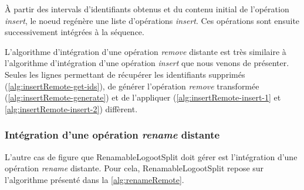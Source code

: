 \documentclass[12pt]{thesul}
\begin{document}
À partir des intervals d'identifiants obtenus et du contenu initial de l'opération \emph{insert}, le noeud regénère une liste d'opérations \emph{insert}.
Ces opérations sont ensuite successivement intégrées à la séquence.

L'algorithme d'intégration d'une opération \emph{remove} distante est très similaire à l'algorithme d'intégration d'une opération \emph{insert} que nous venons de présenter.
Seules les lignes permettant de récupérer les identifiants supprimés (\ref{alg:insertRemote-get-ids}), de générer l'opération \emph{remove} transformée (\ref{alg:insertRemote-generate}) et de l'appliquer (\ref{alg:insertRemote-insert-1} et \ref{alg:insertRemote-insert-2}) diffèrent.

\subsubsection{Intégration d'une opération \emph{rename} distante}

L'autre cas de figure que RenamableLogootSplit doit gérer est l'intégration d'une opération \emph{rename} distante.
Pour cela, RenamableLogootSplit repose sur l'algorithme présenté dans la \autoref{alg:renameRemote}.
\end{document}
